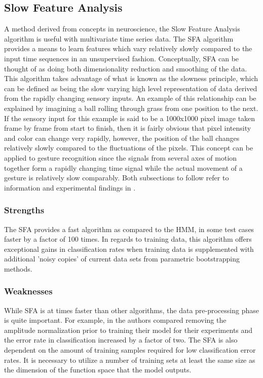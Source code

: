 \documentclass[conference]{IEEEtran}
\begin{document}


\subsection{Slow Feature Analysis}
A method derived from concepts in neuroscience, the Slow Feature Analysis algorithm is useful with multivariate time series data. The SFA algorithm provides a means to learn features which vary relatively slowly compared to the input time sequences in an unsupervised fashion. Conceptually, SFA can be thought of as doing both dimensionality reduction and smoothing of the data. This algorithm takes advantage of what is known as the slowness principle, which can be defined as being the slow varying high level representation of data derived from the rapidly changing sensory inputs. An example of this relationship can be explained by imagining a ball rolling through grass from one position to the next. If the sensory input for this example is said to be a 1000x1000 pixel image taken frame by frame from start to finish, then it is fairly obvious that pixel intensity and color can change very rapidly, however, the position of the ball changes relatively slowly compared to the fluctuations of the pixels. This concept can be applied to gesture recognition since the signals from several axes of motion together form a rapidly changing time signal while the actual movement of a gesture is relatively slow comparably. Both subsections to follow refer to information and experimental findings in \cite{SFA}. 

\subsubsection{Strengths}
The SFA provides a fast algorithm as compared to the HMM, in some test cases faster by a factor of 100 times. In regards to training data, this algorithm offers exceptional gains in classification rates when training data is supplemented with additional 'noisy copies' of current data sets from parametric bootstrapping methods. 

\subsubsection{Weaknesses}
While SFA is at times faster than other algorithms, the data pre-processing phase is quite important. For example, in \cite{SFA} the authors compared removing the amplitude normalization prior to training their model for their experiments and the error rate in classification increased by a factor of two. The SFA is also dependent on the amount of training samples required for low classification error rates. It is necessary to utilize a number of training sets at least the same size as the dimension of the function space that the model outputs.
\end{document}
